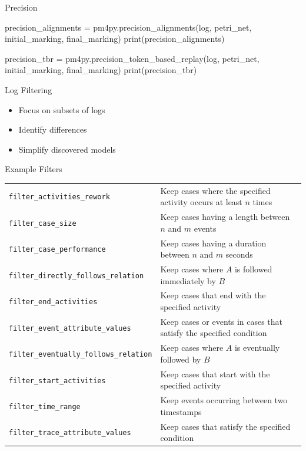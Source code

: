 \documentclass[ignorenonframetext,xcolor=x11names]{beamer}
\begin{document}
\begin{frame}[fragile]{Precision}
\footnotesize
\begin{pythoncode}
precision_alignments = pm4py.precision_alignments(log,
    petri_net, initial_marking, final_marking)
print(precision_alignments)

precision_tbr = pm4py.precision_token_based_replay(log, 
    petri_net, initial_marking, final_marking)
print(precision_tbr)
\end{pythoncode}
\end{frame}

\begin{frame}{Log Filtering}
\begin{itemize}
    \item Focus on subsets of logs
    \item Identify differences
    \item Simplify discovered models
\end{itemize}
\end{frame}

\begin{frame}{Example Filters}
\scriptsize
\renewcommand{\arraystretch}{1.25}
\begin{tabularx}{\textwidth}{l|X} \hline 
\texttt{filter\_activities\_rework} & Keep cases where the specified activity occurs at least $n$ times \\
\texttt{filter\_case\_size} & Keep cases having a length between $n$ and $m$ events \\
\texttt{filter\_case\_performance} & Keep cases having a duration between $n$ and $m$ seconds \\
\texttt{filter\_directly\_follows\_relation} & Keep cases where $A$ is followed immediately by $B$ \\
\texttt{filter\_end\_activities} & Keep cases that end with the specified activity \\
\texttt{filter\_event\_attribute\_values} & Keep cases or events in cases that satisfy the specified condition \\ 
\texttt{filter\_eventually\_follows\_relation} & Keep cases where $A$ is eventually followed by $B$ \\
\texttt{filter\_start\_activities} & Keep cases that start with the specified activity \\
\texttt{filter\_time\_range} & Keep events occurring between two timestamps \\
\texttt{filter\_trace\_attribute\_values} & Keep cases that satisfy the specified condition \\ \hline
\end{tabularx}
\end{frame}
\end{document}
